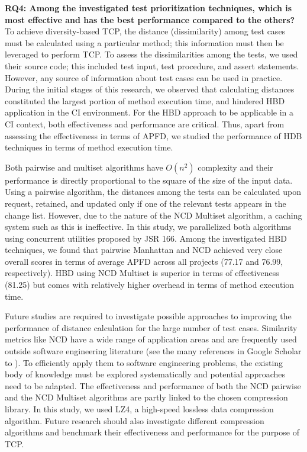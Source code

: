 \documentclass[1p]{elsarticle}
\begin{document}
\textbf{RQ4: Among the investigated test prioritization techniques, which is most effective and has the best performance compared to the others?} To achieve diversity-based TCP, the distance (dissimilarity) among test cases must be calculated using a particular method; this information must then be leveraged to perform TCP. To assess the dissimilarities among the tests, we used their source code; this included test input, test procedure, and assert statements. However, any source of information about test cases can be used in practice. During the initial stages of this research, we observed that calculating distances constituted the largest portion of method execution time, and hindered HBD application in the CI environment. For the HBD approach to be applicable in a CI context, both effectiveness and performance are critical. Thus, apart from assessing the effectiveness in terms of APFD, we studied the performance of HDB techniques in terms of method execution time.

Both pairwise and multiset algorithms have $O(n^{2})$ complexity and their performance is directly proportional to the square of the size of the input data. Using a pairwise algorithm, the distances among the tests can be calculated upon request, retained, and updated only if one of the relevant tests appears in the change list. However, due to the nature of the NCD Multiset algorithm, a caching system such as this is ineffective. In this study, we parallelized both algorithms using concurrent utilities proposed by JSR 166. Among the investigated HBD techniques, we found that pairwise Manhattan and NCD achieved very close overall scores in terms of average APFD across all projects (77.17 and 76.99, respectively). HBD using NCD Multiset is superior in terms of effectiveness (81.25) but comes with relatively higher overhead in terms of method execution time.

Future studies are required to investigate possible approaches to improving the performance of distance calculation for the large number of test cases. Similarity metrics like NCD have a wide range of application areas and are frequently used outside software engineering literature (see the many references in Google Scholar to \cite{li2004similarity,cilibrasi2005clustering}). To efficiently apply them to software engineering problems, the existing body of knowledge must be explored systematically and potential approaches need to be adapted. The effectiveness and performance of both the NCD pairwise and the NCD Multiset algorithms are partly linked to the chosen compression library. In this study, we used LZ4, a high-speed lossless data compression algorithm. Future research should also investigate different compression algorithms and benchmark their effectiveness and performance for the purpose of TCP.
\end{document}
